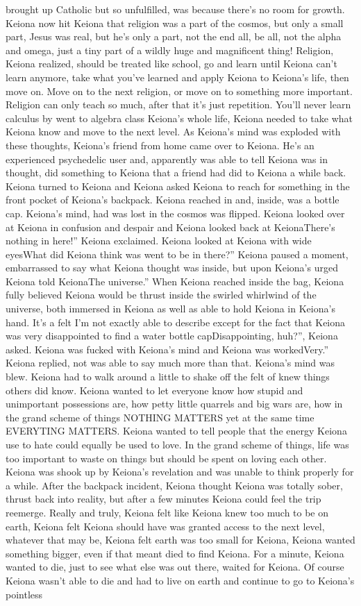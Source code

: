 \documentclass[12pt]{book}
\begin{document}
brought up Catholic but so unfulfilled, was because there's no room for growth. Keiona now hit Keiona that religion was a part of the cosmos, but only a small part, Jesus was real, but he's only a part, not the end all, be all, not the alpha and omega, just a tiny part of a wildly huge and magnificent thing! Religion, Keiona realized, should be treated like school, go and learn until Keiona can't learn anymore, take what you've learned and apply Keiona to Keiona's life, then move on. Move on to the next religion, or move on to something more important. Religion can only teach so much, after that it's just repetition. You'll never learn calculus by went to algebra class Keiona's whole life, Keiona needed to take what Keiona know and move to the next level. As Keiona's mind was exploded with these thoughts, Keiona's friend from home came over to Keiona. He's an experienced psychedelic user and, apparently was able to tell Keiona was in thought, did something to Keiona that a friend had did to Keiona a while back. Keiona turned to Keiona and Keiona asked Keiona to reach for something in the front pocket of Keiona's backpack. Keiona reached in and, inside, was a bottle cap. Keiona's mind, had was lost in the cosmos was flipped. Keiona looked over at Keiona in confusion and despair and Keiona looked back at KeionaThere's nothing in here!'' Keiona exclaimed. Keiona looked at Keiona with wide eyesWhat did Keiona think was went to be in there?'' Keiona paused a moment, embarrassed to say what Keiona thought was inside, but upon Keiona's urged Keiona told KeionaThe universe.'' When Keiona reached inside the bag, Keiona fully believed Keiona would be thrust inside the swirled whirlwind of the universe, both immersed in Keiona as well as able to hold Keiona in Keiona's hand. It's a felt I'm not exactly able to describe except for the fact that Keiona was very disappointed to find a water bottle capDisappointing, huh?'', Keiona asked. Keiona was fucked with Keiona's mind and Keiona was workedVery.'' Keiona replied, not was able to say much more than that. Keiona's mind was blew. Keiona had to walk around a little to shake off the felt of knew things others did know. Keiona wanted to let everyone know how stupid and unimportant possessions are, how petty little quarrels and big wars are, how in the grand scheme of things NOTHING MATTERS yet at the same time EVERYTING MATTERS. Keiona wanted to tell people that the energy Keiona use to hate could equally be used to love. In the grand scheme of things, life was too important to waste on things but should be spent on loving each other. Keiona was shook up by Keiona's revelation and was unable to think properly for a while. After the backpack incident, Keiona thought Keiona was totally sober, thrust back into reality, but after a few minutes Keiona could feel the trip reemerge. Really and truly, Keiona felt like Keiona knew too much to be on earth, Keiona felt Keiona should have was granted access to the next level, whatever that may be, Keiona felt earth was too small for Keiona, Keiona wanted something bigger, even if that meant died to find Keiona. For a minute, Keiona wanted to die, just to see what else was out there, waited for Keiona. Of course Keiona wasn't able to die and had to live on earth and continue to go to Keiona's pointless 
\end{document}
